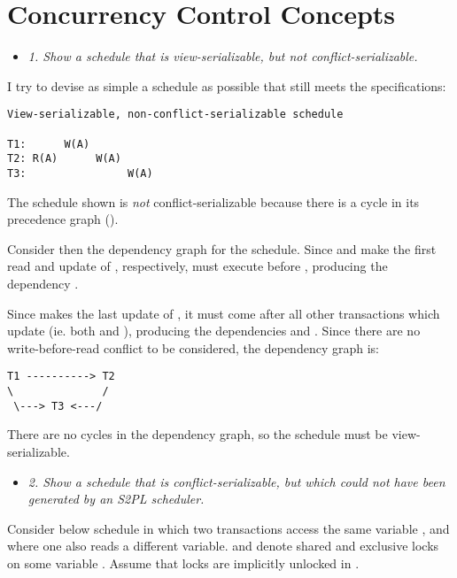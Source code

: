 \section{Concurrency Control Concepts}


\begin{itemize}
  \item \textit{1. Show a schedule that is view-serializable, but not
  conflict-serializable.}
\end{itemize}

I try to devise as simple a schedule as possible that still meets the
specifications:

\begin{verbatim}
View-serializable, non-conflict-serializable schedule

T1:      W(A)
T2: R(A)      W(A)
T3:                W(A)
\end{verbatim}

The schedule shown is \textit{not} conflict-serializable because there is a
cycle in its precedence graph (). \medskip

Consider then the dependency graph for the schedule. Since  and 
make the first read and update of , respectively,  must execute
before , producing the dependency . \smallskip

Since  makes the last update of , it must come after all other
transactions which update  (ie. both  and ), producing the
dependencies  and . Since there are no
write-before-read conflict to be considered, the dependency graph is:

\begin{verbatim}
T1 ----------> T2
\              /
 \---> T3 <---/
\end{verbatim}

There are no cycles in the dependency graph, so the schedule must be
view-serializable.

\streg

\begin{itemize}
  \item \textit{2. Show a schedule that is conflict-serializable, but which
    could not have been generated by an S2PL scheduler.}
\end{itemize}

Consider below schedule in which two transactions access the same variable
, and where one also reads a different variable. 
and  denote shared and exclusive locks on some variable . Assume
that locks are implicitly unlocked in .

